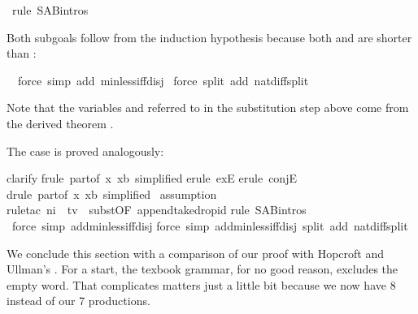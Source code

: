 \begin{isabellebody}
\ rule\ S{\isacharunderscore}A{\isacharunderscore}B{\isachardot}intros{\isacharparenright}%
\begin{isamarkuptxt}%
\noindent
Both subgoals follow from the induction hypothesis because both  and  are shorter than :%
\end{isamarkuptxt}%
\ \ force\ simp\ add{\isacharcolon}\ min{\isacharunderscore}less{\isacharunderscore}iff{\isacharunderscore}disj{\isacharparenright}\isanewline
\ force\ split\ add{\isacharcolon}\ nat{\isacharunderscore}diff{\isacharunderscore}split{\isacharparenright}%
\begin{isamarkuptxt}%
\noindent
Note that the variables  and  referred to in the
substitution step above come from the derived theorem .

The case  is proved analogously:%
\end{isamarkuptxt}%
clarify{\isacharparenright}\isanewline
{}frule\ part{}{\isacharbrackleft}of\ {\isachardoublequote}{\isasymlambda}x{\isachardot}\ x{\isacharequal}b{\isachardoublequote}{\isacharcomma}\ simplified{\isacharbrackright}{\isacharparenright}\isanewline
{}erule\ exE{\isacharparenright}\isanewline
{}erule\ conjE{\isacharparenright}\isanewline
{}drule\ part{}{\isacharbrackleft}of\ {\isachardoublequote}{\isasymlambda}x{\isachardot}\ x{\isacharequal}b{\isachardoublequote}{\isacharcomma}\ simplified{\isacharbrackright}{\isacharparenright}\isanewline
\ assumption{\isacharparenright}\isanewline
{}rule{\isacharunderscore}tac\ n{}{\isacharequal}i\ \ t{\isacharequal}v\ \ subst{\isacharbrackleft}OF\ append{\isacharunderscore}take{\isacharunderscore}drop{\isacharunderscore}id{\isacharbrackright}{\isacharparenright}\isanewline
{}rule\ S{\isacharunderscore}A{\isacharunderscore}B{\isachardot}intros{\isacharparenright}\isanewline
\ force\ simp\ add{\isacharcolon}min{\isacharunderscore}less{\isacharunderscore}iff{\isacharunderscore}disj{\isacharparenright}\isanewline
{}force\ simp\ add{\isacharcolon}min{\isacharunderscore}less{\isacharunderscore}iff{\isacharunderscore}disj\ split\ add{\isacharcolon}\ nat{\isacharunderscore}diff{\isacharunderscore}split{\isacharparenright}%
\begin{isamarkuptext}%
We conclude this section with a comparison of our proof with 
Hopcroft and Ullman's \cite[p.]{HopcroftUllman}. For a start, the texbook
grammar, for no good reason, excludes the empty word.  That complicates
matters just a little bit because we now have 8 instead of our 7 productions.


\end{isamarkuptext}
\end{isabellebody}
